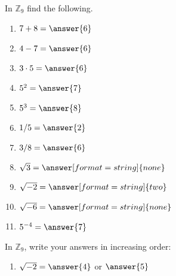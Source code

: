 \documentclass[space,nooutcomes,handout]{ximera}
\begin{document}
\begin{problem}
In $\mathbb{Z}_{9}$ find the following. 
\begin{enumerate}
\item $7 + 8 =\answer{6}$
\item $4 - 7 =\answer{6}$
\item $3\cdot 5 =\answer{6}$
\item $5^2 =\answer{7}$
\item $5^3 =\answer{8}$ 
\item $1/5 =\answer{2}$
\item $3/8 =\answer{6}$ 
\item $\sqrt{3} =\answer[format=string]{none}$ 
\item $\sqrt{-2} =\answer[format=string]{two}$  %
\item $\sqrt{-6} =\answer[format=string]{none}$ 
\item  $5^{-4}  =\answer{7}$ 
\end{enumerate}
\begin{problem}
In $\mathbb{Z}_{9}$, write your answers in increasing order: 
\begin{enumerate}
\item $\sqrt{-2} =\answer{4}$ or $\answer{5}$  %
\end{enumerate}
\end{problem}
\end{problem}
\end{document}
